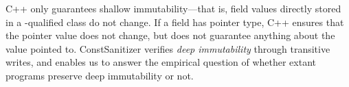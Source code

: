 C++ only guarantees shallow immutability---that is, field values
directly stored in a \const{}-qualified class do not change.
If a field has pointer type, C++ ensures that the pointer value does not change,
but does not guarantee anything about the value pointed to.
ConstSanitizer verifies \emph{deep immutability} through transitive writes, and
enables us to answer the empirical question of whether extant programs preserve
deep immutability or not.
